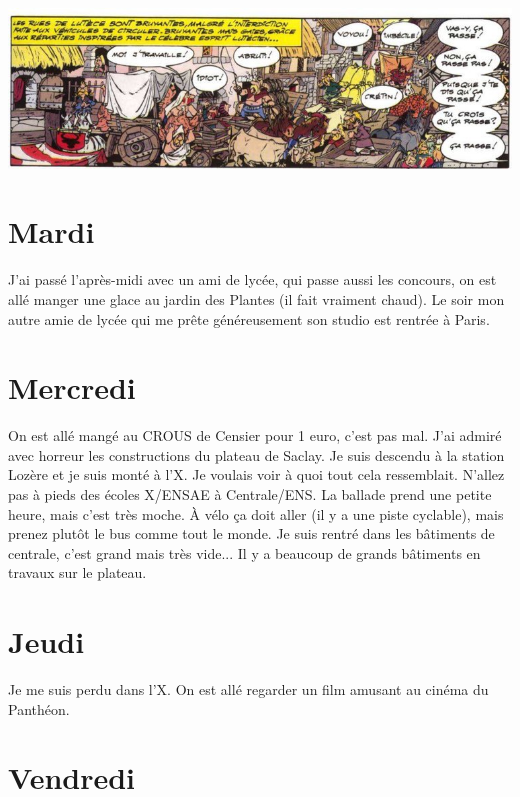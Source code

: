 \documentclass[french,a4paper, 12pt]{article}
\begin{document}
\includegraphics[scale=0.65]{asterix.jpg}

\section*{Mardi}

J'ai passé l'après-midi avec un ami de lycée, qui passe aussi les concours, on est allé manger une glace au jardin des Plantes (il fait vraiment chaud). Le soir mon autre amie de lycée qui me prête généreusement son studio est rentrée à Paris.

\section*{Mercredi}

On est allé mangé au CROUS de Censier pour 1 euro, c'est pas mal. J'ai admiré avec horreur les constructions du plateau de Saclay. Je suis descendu à la station Lozère et je suis monté à l'X. Je voulais voir à quoi tout cela ressemblait. N'allez pas à pieds des écoles X/ENSAE à Centrale/ENS. La ballade prend une petite heure, mais c'est très moche. À vélo ça doit aller (il y a une piste cyclable), mais prenez plutôt le bus comme tout le monde. Je suis rentré dans les bâtiments de centrale, c'est grand mais très vide... Il y a beaucoup de grands bâtiments en travaux sur le plateau. 

\section*{Jeudi}

Je me suis perdu dans l'X. On est allé regarder un film amusant au cinéma du Panthéon.

\section*{Vendredi}
\end{document}
